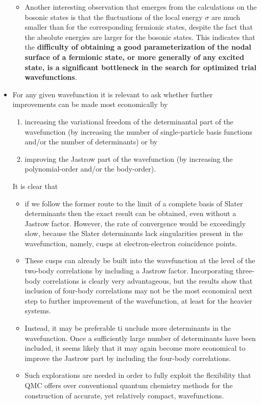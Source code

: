 \documentclass[twoside,english]{uiofysmaster}
\begin{document}
\begin{itemize}
\begin{itemize}
\begin{itemize}
		\end{itemize}
		\item Another interesting observation that emerges from the calculations on the bosonic states is that the fluctuations of the local energy $\sigma$ are much smaller than for the corresponding fermionic states, despite the fact that the absolute energies are larger for the bosonic states. This indicates that the \textbf{difficulty of obtaining a good parameterization of the nodal surface of a fermionic state, or more generally of any excited state, is a significant bottleneck in the search for optimized trial wavefunctions}.
	\end{itemize}
	\item For any given wavefunction it is relevant to ask whether further improvements can be made most economically by 
	\begin{enumerate}
		\item increasing the variational freedom of the determinantal part of the wavefunction (by increasing the number of single-particle basis functions and/or the number of determinants) or by 
		\item improving the Jastrow part of the wavefunction (by increasing the polynomial-order and/or the body-order).
	\end{enumerate}
	It is clear that 
	\begin{itemize}
		\item if we follow the former route to the limit of a complete basis of Slater determinants then the exact result can be obtained, even without a Jastrow factor. However, the rate of convergence would be exceedingly slow, because the Slater determinants lack singularities present in the wavefunction, namely, cusps at electron-electron coincidence points.
		\item These cusps can already be built into the wavefunction at the level of the two-body correlations by including a Jastrow factor. Incorporating three-body correlations is clearly very advantageous, but the results show that inclusion of four-body correlations may not be the most economical next step to further improvement of the wavefunction, at least for the heavier systems. 
		\item Instead, it may be preferable ti unclude more determinants in the wavefunction. Once a sufficiently large number of determinants have been included, it seems likely that it may again become more economical to improve the Jastrow part by including the four-body correlations.
		\item Such explorations are needed in order to fully exploit the flexibility that QMC offers over conventional quantum chemistry methods for the construction of accurate, yet relatively compact, wavefunctions.
	\end{itemize}
\end{itemize}
\end{document}
